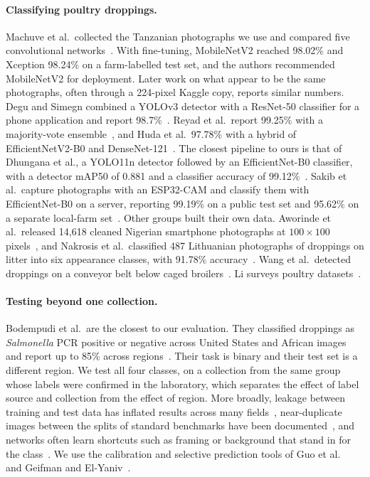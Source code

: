 \documentclass[10pt,twocolumn]{article}
\begin{document}
\paragraph{Classifying poultry droppings.} Machuve et al.\ collected the Tanzanian photographs we use and compared
five convolutional networks~\cite{machuve2022}. With fine-tuning, MobileNetV2 reached 98.02\% and Xception 98.24\% on
a farm-labelled test set, and the authors recommended MobileNetV2 for deployment. Later work on what appear to be the same
photographs, often through a 224-pixel Kaggle copy, reports similar numbers. Degu and Simegn combined a YOLOv3 detector with a
ResNet-50 classifier for a phone application and report 98.7\%~\cite{degu2023}. Reyad et al.\ report 99.25\% with a
majority-vote ensemble~\cite{reyad2024}, and Huda et al.\ 97.78\% with a hybrid of EfficientNetV2-B0 and
DenseNet-121~\cite{huda2024}. The closest pipeline to ours is that of Dhungana et al., a YOLO11n detector followed by
an EfficientNet-B0 classifier, with a detector mAP50 of 0.881 and a classifier accuracy of 99.12\%~\cite{dhungana2025}.
Sakib et al.\ capture photographs with an ESP32-CAM and classify them with EfficientNet-B0 on a server, reporting
99.19\% on a public test set and 95.62\% on a separate local-farm set~\cite{sakib2026}. Other groups built their own
data. Aworinde et al.\ released 14,618 cleaned Nigerian smartphone photographs at $100\times100$
pixels~\cite{aworinde2023}, and Nakrosis et al.\ classified 487 Lithuanian photographs of droppings on litter into six
appearance classes, with 91.78\% accuracy~\cite{nakrosis2023}. Wang et al.\ detected droppings on a conveyor belt
below caged broilers~\cite{wang2019}. Li surveys poultry datasets~\cite{li2025survey}.

\paragraph{Testing beyond one collection.} Bodempudi et al.\ are the closest to our evaluation. They classified
droppings as \emph{Salmonella} PCR positive or negative across United States and African images and report up to
85\% across regions~\cite{bodempudi2026}. Their task is binary and their test set is a different region. We test all
four classes, on a collection from the same group whose labels were confirmed in the laboratory, which separates the
effect of label source and collection from the effect of region. More broadly, leakage between training and test data
has inflated results across many fields~\cite{kapoor2023}, near-duplicate images between the splits of standard
benchmarks have been documented~\cite{barz2020}, and networks often learn shortcuts such as framing or background that
stand in for the class~\cite{geirhos2020}. We use the calibration and selective prediction tools of Guo et
al.~\cite{guo2017} and Geifman and El-Yaniv~\cite{geifman2017}.
\end{document}
